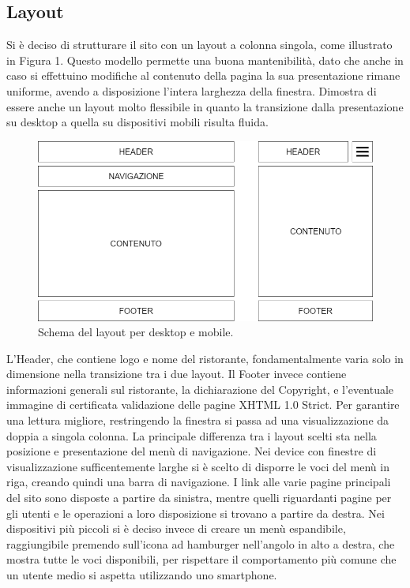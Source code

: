 \documentclass{article}
\begin{document}
		\subsection{Layout}
			Si è deciso di strutturare il sito con un layout a colonna singola, come illustrato in Figura 1. Questo modello permette una buona mantenibilità, dato che anche in caso si effettuino modifiche al contenuto della pagina la sua presentazione rimane uniforme, avendo a disposizione l'intera larghezza della finestra. 
		    Dimostra di essere anche un layout molto flessibile in quanto la transizione dalla presentazione su desktop a quella su dispositivi mobili risulta fluida.
		    \begin{figure}[http] %
		        \centering
		        \includegraphics[width=\textwidth]{schema_layout.png}
		        \caption{Schema del layout per desktop e mobile.}
		        \label{fig:layout}
		    \end{figure}
		    \bigbreak
		    L'Header, che contiene logo e nome del ristorante, fondamentalmente varia solo in dimensione nella transizione tra i due layout.
		    \bigbreak
		    Il Footer invece contiene informazioni generali sul ristorante, la dichiarazione del Copyright, e l'eventuale immagine di certificata validazione delle pagine XHTML 1.0 Strict. Per garantire una lettura migliore, restringendo la finestra si passa ad una visualizzazione da doppia a singola colonna.
		    \bigbreak
		    La principale differenza tra i layout scelti sta nella posizione e presentazione del menù di navigazione. 
		    \newline Nei device con finestre di visualizzazione sufficentemente larghe si è scelto di disporre le voci del menù in riga, creando quindi una barra di navigazione. I link alle varie pagine principali del sito sono disposte a partire da sinistra, mentre quelli riguardanti pagine per gli utenti e le operazioni a loro disposizione si trovano a partire da destra.
		    \newline Nei dispositivi più piccoli si è deciso invece di creare un menù espandibile, raggiungibile premendo sull'icona ad hamburger nell'angolo in alto a destra, che mostra tutte le voci disponibili, per rispettare il comportamento più comune che un utente medio si aspetta utilizzando uno smartphone.
		\newpage
\end{document}

